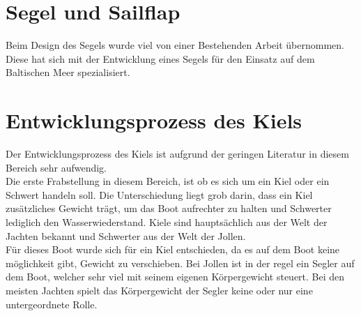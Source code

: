



\section{Segel und Sailflap}
Beim Design des Segels wurde viel von einer Bestehenden Arbeit übernommen. Diese hat sich mit der Entwicklung eines Segels für den Einsatz auf dem Baltischen Meer spezialisiert.



\section{Entwicklungsprozess des Kiels}
Der Entwicklungsprozess des Kiels ist aufgrund der geringen Literatur in diesem Bereich sehr aufwendig. \\ Die erste Frabstellung in diesem Bereich, ist ob es sich um ein Kiel oder ein Schwert handeln soll. Die Unterschiedung liegt grob darin, dass ein Kiel zusätzliches Gewicht trägt, um das Boot aufrechter zu halten und Schwerter lediglich den Wasserwiederstand. Kiele sind hauptsächlich aus der Welt der Jachten bekannt und Schwerter aus der Welt der Jollen. \\
Für dieses Boot wurde sich für ein Kiel entschieden, da es auf dem Boot keine möglichkeit gibt, Gewicht zu verschieben. Bei Jollen ist in der regel ein Segler auf dem Boot, welcher sehr viel mit seinem eigenen Körpergewicht steuert. Bei den meisten Jachten spielt das Körpergewicht der Segler keine oder nur eine untergeordnete Rolle.